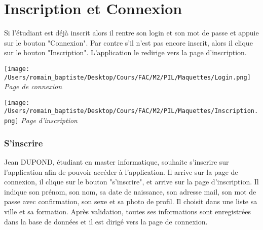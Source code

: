 \section*{Inscription et Connexion}
Si l'étudiant est déjà inscrit alors il rentre son login et son mot de passe et appuie sur le bouton "Connexion". Par contre s'il n'est pas encore inscrit, alors il clique sur le bouton "Inscription". L'application le redirige vers la page d'inscription.  
\begin{center}
\texttt{[image: /Users/romain\_baptiste/Desktop/Cours/FAC/M2/PIL/Maquettes/Login.png]}
\emph{Page de connexion}
\end{center}
\begin{center}
\texttt{[image: /Users/romain\_baptiste/Desktop/Cours/FAC/M2/PIL/Maquettes/Inscription.png]}
\emph{Page d'inscription}
\end{center}
\subsubsection*{S’inscrire}
Jean DUPOND, étudiant en master informatique, souhaite s’inscrire sur l'application afin de pouvoir accéder à l'application. Il arrive sur la page de connexion, il clique sur le bouton "s'inscrire", et arrive sur la page d'inscription. Il indique son prénom, son nom, sa date de naissance, son adresse mail, son mot de passe avec confirmation, son sexe et sa photo de profil. Il choisit dans une liste sa ville et sa formation. Après validation, toutes ses informations sont enregistrées dans la base de données et il est dirigé vers la page de connexion.